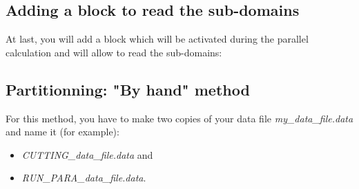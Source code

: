 \subsection{Adding a block to read the sub-domains}
At last, you will add a block which will be activated during the parallel calculation and will allow to read the sub-domains:
\begin{center}
\end{center}


\subsection{Partitionning: "By hand" method}
For this method, you have to make two copies of your data file \textit{my\_data\_file.data} and name it (for example):
\begin{itemize}
\item \textit{CUTTING\_data\_file.data} and 
\item \textit{RUN\_PARA\_data\_file.data}.
\end{itemize}

